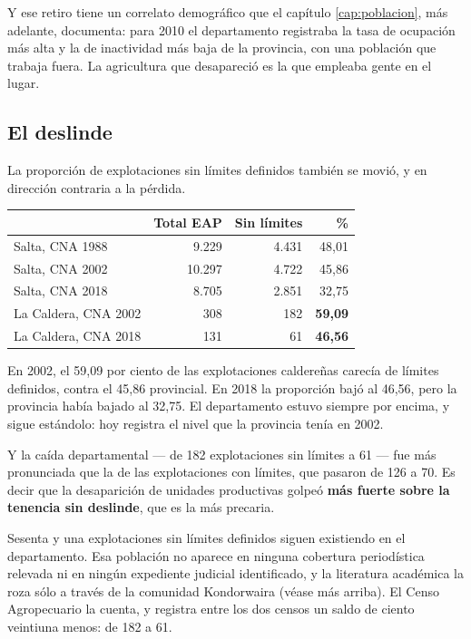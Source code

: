 Y ese retiro tiene un correlato demográfico que el capítulo \ref{cap:poblacion}, más adelante, documenta: para 2010 el departamento registraba la tasa de ocupación más alta y la de inactividad más baja de la provincia, con una población que trabaja fuera. La agricultura que desapareció es la que empleaba gente en el lugar.

\subsection*{El deslinde}

La proporción de explotaciones sin límites definidos también se movió, y en dirección contraria a la pérdida.

{\small
\begin{longtable}{@{}lrrr@{}}
\toprule
 & Total EAP & Sin límites & \% \\
\midrule
\endhead
Salta, CNA 1988 & 9.229 & 4.431 & 48,01 \\
Salta, CNA 2002 & 10.297 & 4.722 & 45,86 \\
Salta, CNA 2018 & 8.705 & 2.851 & 32,75 \\
\midrule
La Caldera, CNA 2002 & 308 & 182 & \textbf{59,09} \\
La Caldera, CNA 2018 & 131 & 61 & \textbf{46,56} \\
\bottomrule
\end{longtable}}

En 2002, el 59,09 por ciento de las explotaciones caldereñas carecía de límites definidos, contra el 45,86 provincial. En 2018 la proporción bajó al 46,56, pero la provincia había bajado al 32,75. El departamento estuvo siempre por encima, y sigue estándolo: hoy registra el nivel que la provincia tenía en 2002.

Y la caída departamental --- de 182 explotaciones sin límites a 61 --- fue más pronunciada que la de las explotaciones con límites, que pasaron de 126 a 70. Es decir que la desaparición de unidades productivas golpeó \textbf{más fuerte sobre la tenencia sin deslinde}, que es la más precaria.

Sesenta y una explotaciones sin límites definidos siguen existiendo en el departamento. Esa población no aparece en ninguna cobertura periodística relevada ni en ningún expediente judicial identificado, y la literatura académica la roza sólo a través de la comunidad Kondorwaira (véase más arriba). El Censo Agropecuario la cuenta, y registra entre los dos censos un saldo de ciento veintiuna menos: de 182 a 61.


